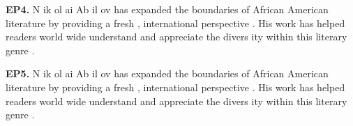 \begin{mdframed}
\textbf{EP4.} \textcolor{Gray0}{N} \textcolor{Gray0}{ik} \textcolor{Gray8}{ol} \textcolor{Gray7}{ai} \textcolor{Gray0}{Ab} \textcolor{Gray2}{il} \textcolor{Gray0}{ov} \textcolor{Gray0}{has} \textcolor{Gray0}{expanded} \textcolor{Gray0}{the} \textcolor{Gray0}{boundaries} \textcolor{Gray0}{of} \textcolor{Gray0}{African} \textcolor{Gray1}{American} \textcolor{Gray0}{literature} \textcolor{Gray0}{by} \textcolor{Gray0}{providing} \textcolor{Gray0}{a} \textcolor{Gray0}{fresh} \textcolor{Gray0}{,} \textcolor{Gray0}{international} \textcolor{Gray1}{perspective} \textcolor{Gray0}{.} \textcolor{Gray0}{His} \textcolor{Gray0}{work} \textcolor{Gray0}{has} \textcolor{Gray0}{helped} \textcolor{Gray0}{readers} \textcolor{Gray0}{world} \textcolor{Gray3}{wide} \textcolor{Gray0}{understand} \textcolor{Gray1}{and} \textcolor{Gray1}{appreciate} \textcolor{Gray0}{the} \textcolor{Gray0}{divers} \textcolor{Gray2}{ity} \textcolor{Gray0}{within} \textcolor{Gray0}{this} \textcolor{Gray0}{literary} \textcolor{Gray0}{genre} \textcolor{Gray0}{.}

\textbf{EP5.} \textcolor{Gray0}{N} \textcolor{Gray0}{ik} \textcolor{Gray7}{ol} \textcolor{Gray6}{ai} \textcolor{Gray0}{Ab} \textcolor{Gray0}{il} \textcolor{Gray0}{ov} \textcolor{Gray0}{has} \textcolor{Gray0}{expanded} \textcolor{Gray0}{the} \textcolor{Gray0}{boundaries} \textcolor{Gray0}{of} \textcolor{Gray0}{African} \textcolor{Gray0}{American} \textcolor{Gray0}{literature} \textcolor{Gray0}{by} \textcolor{Gray0}{providing} \textcolor{Gray0}{a} \textcolor{Gray0}{fresh} \textcolor{Gray0}{,} \textcolor{Gray0}{international} \textcolor{Gray0}{perspective} \textcolor{Gray0}{.} \textcolor{Gray0}{His} \textcolor{Gray0}{work} \textcolor{Gray0}{has} \textcolor{Gray0}{helped} \textcolor{Gray0}{readers} \textcolor{Gray0}{world} \textcolor{Gray1}{wide} \textcolor{Gray0}{understand} \textcolor{Gray0}{and} \textcolor{Gray0}{appreciate} \textcolor{Gray0}{the} \textcolor{Gray0}{divers} \textcolor{Gray2}{ity} \textcolor{Gray0}{within} \textcolor{Gray0}{this} \textcolor{Gray0}{literary} \textcolor{Gray0}{genre} \textcolor{Gray0}{.} 

\end{mdframed}